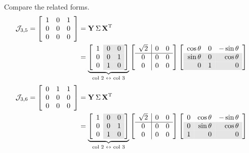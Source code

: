 Compare the related forms.
\begin{equation}
  \begin{split}
    \mathcal{J}_{3,5} = 
\mat{ccc}
{
                1 & 0 & 1 \\
                0 & 0 & 0 \\
                0 & 0 & 0
}   &= \svd{T}\\
   &=
\underbrace{\mat{c>{\columncolor{ltgray}}c>{\columncolor{ltgray}}c}
{
                1 & 0 & 0 \\
                0 & 0 & 1 \\
                0 & 1 & 0
}}_{\text{col 2 $\leftrightarrow$ col 3}}
\mat{c|cc}{                
            \sqrt{2} & 0 & 0 \\\hline
            0 & 0 & 0 \\
            0 & 0 & 0
}%
\mat{rcr}{                
                 \cos\theta & 0 & -\sin\theta \\
\rowcolor{ltgray}
                 \sin\theta & 0 &  \cos\theta \\
\rowcolor{ltgray}
                0 & 1 & 0
}
  \end{split}
\end{equation}
\begin{equation}
  \begin{split}
    \mathcal{J}_{3,6} = 
\mat{ccc}{
                0 & 1 & 1 \\
                0 & 0 & 0 \\
                0 & 0 & 0
}   &= \svd{T}\\
   &=
\underbrace{\mat{c>{\columncolor{ltgray}}c>{\columncolor{ltgray}}c}
{
                1 & 0 & 0 \\
                0 & 0 & 1 \\
                0 & 1 & 0
}}_{\text{col 2 $\leftrightarrow$ col 3}}
\mat{c|cc}{                
            \sqrt{2} & 0 & 0 \\\hline
            0 & 0 & 0 \\
            0 & 0 & 0
}%
\mat{rrr}{                
                0 & \cos\theta & -\sin\theta \\
\rowcolor{ltgray}
                0 & \sin\theta & \cos\theta \\
\rowcolor{ltgray}
                1 & 0 & 0
}
  \end{split}
\end{equation}

